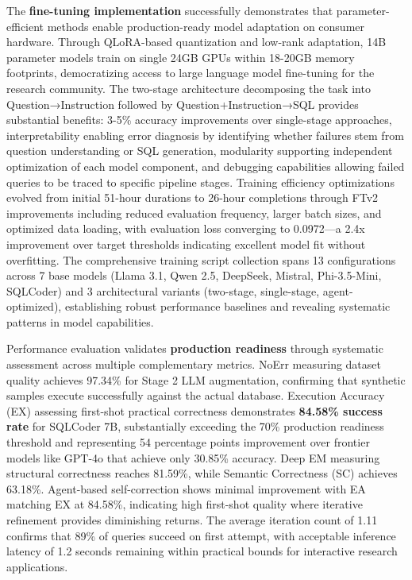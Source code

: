 The \textbf{fine-tuning implementation} successfully demonstrates that parameter-efficient methods enable production-ready model adaptation on consumer hardware. Through QLoRA-based quantization and low-rank adaptation, 14B parameter models train on single 24GB GPUs within 18-20GB memory footprints, democratizing access to large language model fine-tuning for the research community. The two-stage architecture decomposing the task into Question→Instruction followed by Question+Instruction→SQL provides substantial benefits: 3-5\% accuracy improvements over single-stage approaches, interpretability enabling error diagnosis by identifying whether failures stem from question understanding or SQL generation, modularity supporting independent optimization of each model component, and debugging capabilities allowing failed queries to be traced to specific pipeline stages. Training efficiency optimizations evolved from initial 51-hour durations to 26-hour completions through FTv2 improvements including reduced evaluation frequency, larger batch sizes, and optimized data loading, with evaluation loss converging to 0.0972---a 2.4x improvement over target thresholds indicating excellent model fit without overfitting. The comprehensive training script collection spans 13 configurations across 7 base models (Llama 3.1, Qwen 2.5, DeepSeek, Mistral, Phi-3.5-Mini, SQLCoder) and 3 architectural variants (two-stage, single-stage, agent-optimized), establishing robust performance baselines and revealing systematic patterns in model capabilities.

Performance evaluation validates \textbf{production readiness} through systematic assessment across multiple complementary metrics. NoErr measuring dataset quality achieves 97.34\% for Stage 2 LLM augmentation, confirming that synthetic samples execute successfully against the actual database. Execution Accuracy (EX) assessing first-shot practical correctness demonstrates \textbf{84.58\% success rate} for SQLCoder 7B, substantially exceeding the 70\% production readiness threshold and representing 54 percentage points improvement over frontier models like GPT-4o that achieve only 30.85\% accuracy. Deep EM measuring structural correctness reaches 81.59\%, while Semantic Correctness (SC) achieves 63.18\%. Agent-based self-correction shows minimal improvement with EA matching EX at 84.58\%, indicating high first-shot quality where iterative refinement provides diminishing returns. The average iteration count of 1.11 confirms that 89\% of queries succeed on first attempt, with acceptable inference latency of 1.2 seconds remaining within practical bounds for interactive research applications.


